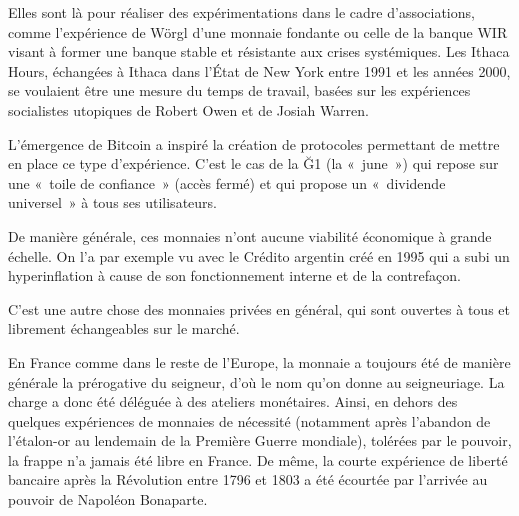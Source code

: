 Elles sont là pour réaliser des expérimentations dans le cadre d'associations, comme l'expérience de Wörgl d'une monnaie fondante ou celle de la banque WIR visant à former une banque stable et résistante aux crises systémiques. Les Ithaca Hours, échangées à Ithaca dans l'État de New York entre 1991 et les années 2000, se voulaient être une mesure du temps de travail, basées sur les expériences socialistes utopiques de Robert Owen et de Josiah Warren.

L'émergence de Bitcoin a inspiré la création de protocoles permettant de mettre en place ce type d'expérience. C'est le cas de la Ğ1 (la «~june~») qui repose sur une «~toile de confiance~» (accès fermé) et qui propose un «~dividende universel~» à tous ses utilisateurs. %

De manière générale, ces monnaies n'ont aucune viabilité économique à grande échelle. On l'a par exemple vu avec le Crédito argentin créé en 1995 qui a subi un hyperinflation à cause de son fonctionnement interne et de la contrefaçon.


C'est une autre chose des monnaies privées en général, qui sont ouvertes à tous et librement échangeables sur le marché.

En France comme dans le reste de l'Europe, la monnaie a toujours été de manière générale la prérogative du seigneur, d'où le nom qu'on donne au seigneuriage. La charge a donc été déléguée à des ateliers monétaires. Ainsi, en dehors des quelques expériences de monnaies de nécessité (notamment après l'abandon de l'étalon-or au lendemain de la Première Guerre mondiale), tolérées par le pouvoir, la frappe n'a jamais été libre en France. De même, la courte expérience de liberté bancaire après la Révolution entre 1796 et 1803 a été écourtée par l'arrivée au pouvoir de Napoléon Bonaparte.

